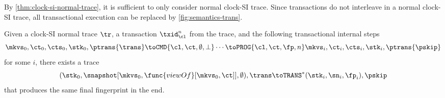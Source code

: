 By \cref{thm:clock-si-normal-trace}, it is sufficient to only consider normal clock-SI trace.
Since transactions do not interleave in a normal clock-SI trace,
all transactional execution can be replaced by \cref{fig:semantics-trans}.
\begin{theorem}[Simulation]
    \label{thm:clock-si-transaction-to-atomic}
    Given a clock-SI normal trace \( \tr \), a transaction \( \txid_\cl^n \) from the trace,
    and the following transactional internal steps
    \[
        \mkvs_0, \ct_0, \cts_0, \stk_0, \ptrans{\trans} \toCMD{\cl,\ct,\emptyset,\perp} \cdots  \toPROG{\cl,\ct,\fp,n} \mkvs_i, \ct_i, \cts_i, \stk_i, \ptrans{\pskip}
    \]
    for some \( i \), there exists a trace
    \[
        (\stk_0, \snapshot[\mkvs_0,\func{viewOf}[\mkvs_0,\ct]], \emptyset), \trans \toTRANS^*
        (\stk_i, \sn_i, \fp_i), \pskip
    \]
    that produces the same final fingerprint in the end.
\end{theorem}
